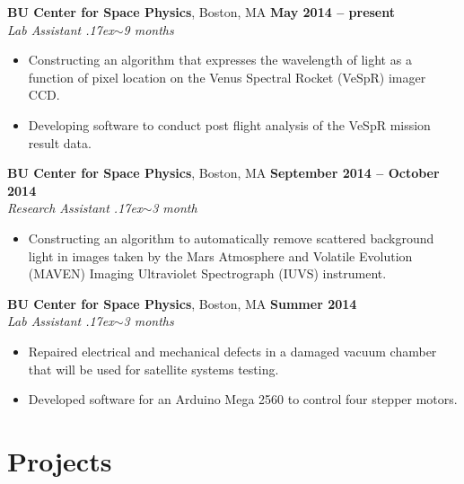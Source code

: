 \documentclass[margin,line,a4paper]{resume}
\newcommand{\about}{\raise.17ex\hbox{$\scriptstyle\mathtt{\sim}$}}
\begin{document}
\begin{resume}
    \textbf{BU Center for Space Physics}, Boston, MA \hfill \textbf{May 2014 -- present} \\
    \textsl{Lab Assistant \hfill \about 9 months}
    \vspace{1mm}
    \begin{itemize}[leftmargin=2em]
        \item Constructing an algorithm that expresses the wavelength of light as a
          function of pixel location on the Venus Spectral Rocket (VeSpR) imager CCD.
        \item Developing software to conduct post flight analysis of the VeSpR mission result data.
    \end{itemize}
    
    \textbf{BU Center for Space Physics}, Boston, MA \hfill \textbf{September 2014 -- October 2014} \\
    \textsl{Research Assistant \hfill \about 3 month}
    \vspace{1mm}
    \begin{itemize}[leftmargin=2em]
        \item Constructing an algorithm to automatically remove scattered background
          light in images taken by the Mars Atmosphere and Volatile Evolution
          (MAVEN) Imaging Ultraviolet Spectrograph (IUVS) instrument.
    \end{itemize}
    
    \textbf{BU Center for Space Physics}, Boston, MA \hfill \textbf{Summer 2014} \\
    \textsl{Lab Assistant \hfill \about 3 months}
    \vspace{1mm}
    \begin{itemize}[leftmargin=2em]
        \item Repaired electrical and mechanical defects in a damaged vacuum
          chamber that will be used for satellite systems testing.
        \item Developed software for an Arduino Mega 2560 to control four stepper motors.
    \end{itemize}
    
    
    \section{\mysidestyle Projects}
    

\end{resume}
\end{document}
